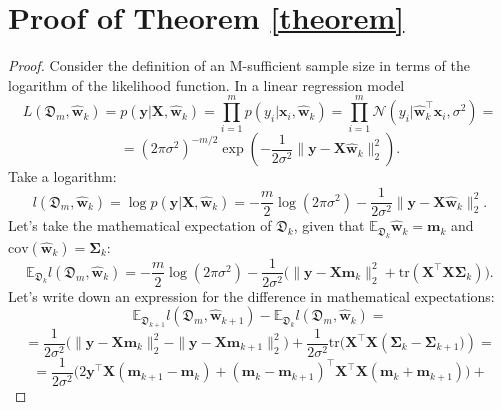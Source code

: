 \documentclass[runningheads]{llncs}
\begin{document}
%
%
%
\clearpage


%

\clearpage
\appendix

\section{Proof of Theorem \ref{theorem}}

\begin{proof}
Consider the definition of an M-sufficient sample size in terms of the logarithm of the likelihood function. In a linear regression model
    \[ L\left( \mathfrak{D}_m, \hat{\mathbf{w}}_k \right) = p(\mathbf{y} | \mathbf{X}, \hat{\mathbf{w}}_k) = \prod_{i=1}^{m} p(y_i | \mathbf{x}_i, \hat{\mathbf{w}}_k) = \prod_{i=1}^{m} \mathcal{N}\left( y_i | \hat{\mathbf{w}}_k^{\top} \mathbf{x}_i, \sigma^2 \right) = \]
    \[= \left(2\pi\sigma^2 \right)^{-m/2} \exp\left(-\dfrac{1}{2\sigma^2}\|\mathbf{y} -\mathbf{X} \hat{\mathbf{w}}_k\|_2^2 \right). \]
Take a logarithm:
    \[ l\left( \mathfrak{D}_m, \hat{\mathbf{w}}_k \right) = \log p(\mathbf{y} | \mathbf{X}, \hat{\mathbf{w}}_k) = -\dfrac{m}{2}\log\left( 2\pi\sigma^2 \right) - \dfrac{1}{2\sigma^2} \| \mathbf{y} - \mathbf{X} \hat{\mathbf{w}}_k \|_2^2. \]
Let's take the mathematical expectation of $\mathfrak{D}_k$, given that $\mathbb{E}_{\mathfrak{D}_k}\hat{\mathbf{w}}_k=\mathbf{m}_k$ and $\text{cov}(\hat{\mathbf{w}}_k) = \mathbf{\Sigma}_k$:
    \[ \mathbb{E}_{\mathfrak{D}_k} l\left( \mathfrak{D}_m, \hat{\mathbf{w}}_k \right) = -\dfrac{m}{2}\log\left( 2\pi\sigma^2 \right) - \dfrac{1}{2\sigma^2} \Big( \| \mathbf{y} - \mathbf{X} \mathbf{m}_k \|_2^2 + \text{tr}\left( \mathbf{X}^{\top}\mathbf{X} \mathbf{\Sigma}_k \right) \Big). \]
    Let's write down an expression for the difference in mathematical expectations:
    \[ \mathbb{E}_{\mathfrak{D}_{k+1}} l(\mathfrak{D}_m, \hat{\mathbf{w}}_{k+1}) - \mathbb{E}_{\mathfrak{D}_k} l(\mathfrak{D}_m, \hat{\mathbf{w}}_{k}) = \]
    \[ = \dfrac{1}{2\sigma^2} \Big( \| \mathbf{y} - \mathbf{X} \mathbf{m}_k \|_2^2 - \| \mathbf{y} - \mathbf{X} \mathbf{m}_{k+1} \|_2^2 \Big) + \dfrac{1}{2\sigma^2} \text{tr} \Big( \mathbf{X}^{\top}\mathbf{X} \left( \mathbf{\Sigma}_k - \mathbf{\Sigma}_{k+1} \Big) \right) = \]
    \[ = \dfrac{1}{2\sigma^2} \Big( 2 \mathbf{y}^{\top} \mathbf{X} (\mathbf{m}_{k+1} - \mathbf{m}_k) + (\mathbf{m}_k - \mathbf{m}_{k+1})^{\top} \mathbf{X}^{\top}\mathbf{X} (\mathbf{m}_k + \mathbf{m}_{k+1}) \Big) + \]

\end{proof}
\end{document}
